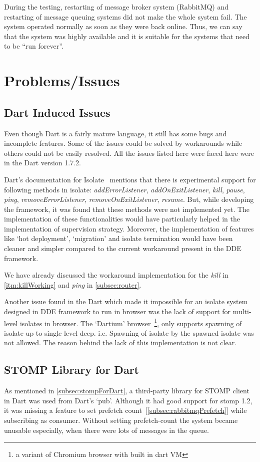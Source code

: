   During the testing, restarting of message broker system (RabbitMQ) and restarting of message queuing systems did not make the whole system fail. The system operated normally as soon as they were back online. Thus, we can say that the system was highly available and it is suitable for the systems that need to be “run forever”.

\section{Problems/Issues}

\subsection{Dart Induced Issues}
\label{subsec:result-dartIssues}
  Even though Dart is a fairly mature language, it still has some bugs and incomplete features. Some of the issues could be solved by workarounds while others could not be easily resolved. All the issues listed here were faced here were in the Dart version 1.7.2.

  Dart's documentation for Isolate~\cite{dartApiIsolate} mentions that there is experimental support for following methods in isolate: \emph{addErrorListener},  \emph{addOnExitListener}, \emph{kill}, \emph{pause}, \emph{ping}, \emph{removeErrorListener}, \emph{removeOnExitListener}, \emph{resume}. But, while developing the framework, it was found that these methods were not implemented yet. The implementation of these functionalities would have particularly helped in the implementation of supervision strategy. Moreover, the implementation of features like ‘hot deployment’, ‘migration’ and isolate termination would have been cleaner and simpler compared to the current workaround present in the DDE framework.

  We have already discussed the workaround implementation for the \emph{kill} in \autoref{itm:killWorking} and \emph{ping} in \autoref{subsec:router}.

  Another issue found in the Dart which made it impossible for an isolate system designed in DDE framework to run in browser was the lack of support for multi-level isolates in browser. The ‘Dartium’ browser~\footnote{a variant of Chromium browser with built in dart VM}, only supports spawning of isolate up to single level deep. i.e. Spawning of isolate by the spawned isolate was not allowed. The reason behind the lack of this implementation is not clear.

\subsection{STOMP Library for Dart}
  As mentioned in \autoref{subsec:stompForDart}, a third-party library for STOMP client in Dart was used from Dart's ‘pub’. Although it had good support for stomp 1.2, it was missing a feature to set prefetch count~[\autoref{subsec:rabbitmqPrefetch}] while subscribing as consumer. Without setting prefetch-count the system became unusable especially, when there were lots of messages in the queue.

